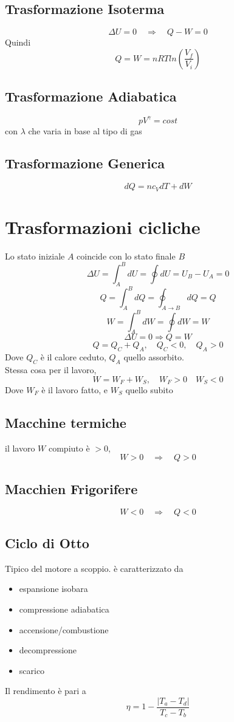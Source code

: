 \documentclass[a4paper]{report}
\begin{document}
  \subsection{Trasformazione Isoterma}
  $$ \Delta U = 0 \quad \Rightarrow \quad Q-W =0 $$
  Quindi
  $$ Q = W = n R T ln(\frac{V_f}{V_i}) $$
  \subsection{Trasformazione Adiabatica}
  $$ p V^{\gamma} = cost $$
  con $\lambda$ che varia in base al tipo di gas
  \subsection{Trasformazione Generica}
  $$ dQ = nc_V dT + dW $$

  \section{Trasformazioni cicliche}
  Lo stato iniziale $A$ coincide con lo stato finale $B$
  $$ \Delta U = \int_A^B dU = \oint dU = U_B - U_A = 0 $$
  $$ Q = \int_A^B dQ = \oint_{A \rightarrow B} dQ = Q $$
  $$ W = \int_A^B dW = \oint dW = W $$
  $$ \Delta U = 0 \Rightarrow Q = W $$
  $$ Q = Q_C + Q_A,  \quad Q_C < 0, \quad Q_A > 0 $$
  Dove $Q_C$ è il calore ceduto, $Q_A$ quello assorbito.\\
  Stessa cosa per il lavoro,
  $$ W = W_F + W_S, \quad W_F > 0  \quad W_S < 0 $$
  Dove $W_F$ è il lavoro fatto, e $W_S$ quello subito
  \subsection{Macchine termiche}
  il lavoro $W$ compiuto è $>0$,
  $$ W>0 \quad \Rightarrow \quad Q > 0 $$
  \subsection{Macchien Frigorifere}
  $$ W<0 \quad \Rightarrow \quad Q < 0 $$

  \subsection{Ciclo di Otto}
  Tipico del motore a scoppio. è caratterizzato da
  \begin{itemize}
    \item espansione isobara
    \item compressione adiabatica
    \item accensione/combustione
    \item decompressione
    \item scarico
  \end{itemize}
  Il rendimento è pari a
  $$ \eta = 1 - \frac{|T_a - T_d|}{T_c - T_b} $$
\end{document}
